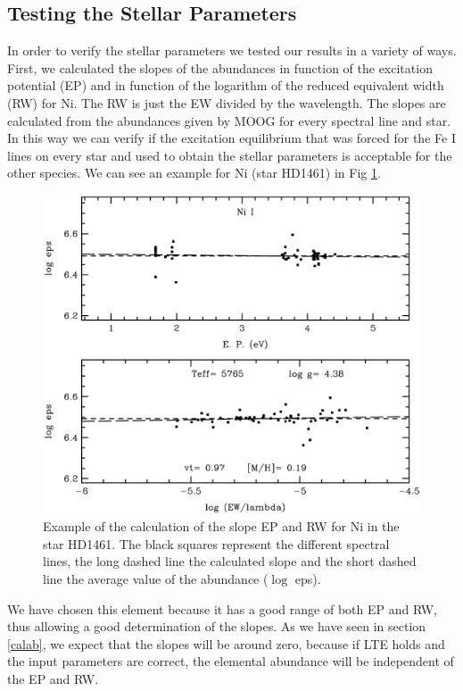 \documentclass[dvips,12pt,a4paper]{report}
\begin{document}
{{%

\subsection {Testing the Stellar Parameters}
\label{testpar}
In order to verify the stellar parameters we tested our results in a variety of ways. First, we calculated the slopes of the abundances in function of the excitation potential (EP) and in function of the logarithm of the reduced equivalent width (RW) for Ni. The RW is just the EW divided by the wavelength. The slopes are calculated from the abundances given by MOOG for every spectral line and star. In this way we can verify if the excitation equilibrium that was forced for the Fe I lines on every star and used to obtain the stellar parameters \citep{Santos-2000b} is acceptable for the other species. We can see an example for Ni (star HD1461) in Fig \ref{exslope}.
\begin{figure}[h]
\centering
\includegraphics[trim=0mm 0mm 0mm 10mm, clip,width= 10 cm]{pics/parte3/moogpicniq.eps}
\caption[Example of the calculation for Ni of the slope EP and RW]{Example of the calculation of the slope EP and RW for Ni in the star HD1461. The black squares represent the different spectral lines, the long dashed line the calculated slope and the short dashed line the average value of the abundance ($\log$ eps).}
\label{exslope}
\end{figure}
We have chosen this element because it has a good range of both EP and RW, thus allowing a good determination of the slopes. As we have seen in section \ref{calab}, we expect that the slopes will be around zero, because if LTE holds and the input parameters are correct, the elemental abundance will be independent of the EP and RW. 

}}
\end{document}
